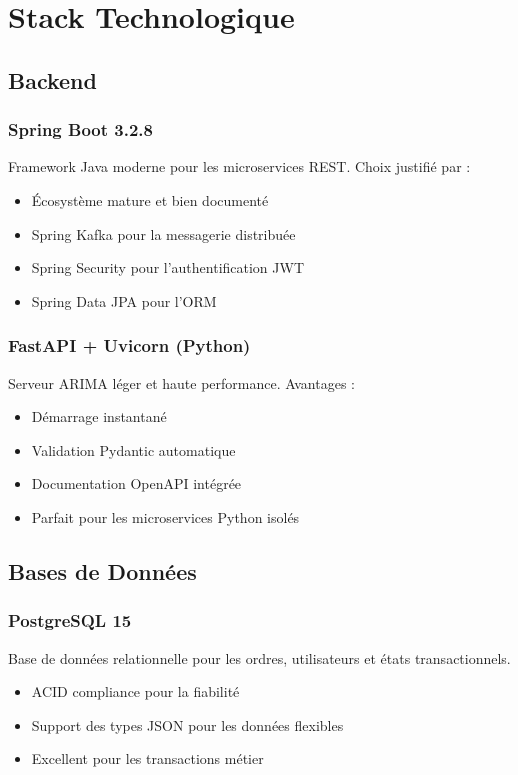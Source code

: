 \documentclass[12pt,a4paper,twoside]{report}
\begin{document}
\chapter{Stack Technologique}

\section{Backend}

\subsection{Spring Boot 3.2.8}
Framework Java moderne pour les microservices REST. Choix justifié par :
\begin{itemize}
    \item Écosystème mature et bien documenté
    \item Spring Kafka pour la messagerie distribuée
    \item Spring Security pour l'authentification JWT
    \item Spring Data JPA pour l'ORM
\end{itemize}

\subsection{FastAPI + Uvicorn (Python)}
Serveur ARIMA léger et haute performance. Avantages :
\begin{itemize}
    \item Démarrage instantané
    \item Validation Pydantic automatique
    \item Documentation OpenAPI intégrée
    \item Parfait pour les microservices Python isolés
\end{itemize}

\section{Bases de Données}

\subsection{PostgreSQL 15}
Base de données relationnelle pour les ordres, utilisateurs et états transactionnels.
\begin{itemize}
    \item ACID compliance pour la fiabilité
    \item Support des types JSON pour les données flexibles
    \item Excellent pour les transactions métier
\end{itemize}
\end{document}
